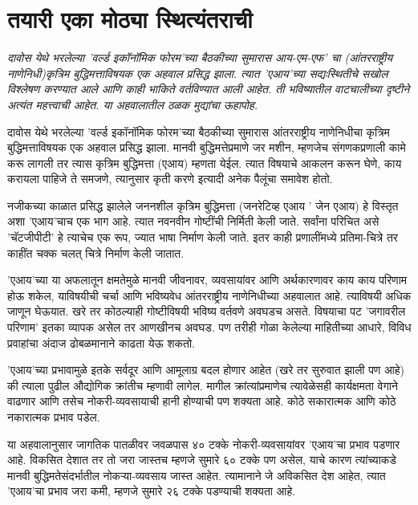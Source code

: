 \chapter{तयारी एका मोठ्या स्थित्यंतराची }

{\textit{दावोस येथे भरलेल्या 'वर्ल्ड इकॉनॉमिक फोरम'च्या बैठकीच्या सुमारास आय-एम-एफ' चा (आंतरराष्ट्रीय नाणेनिधी)कृत्रिम बुद्धिमत्ताविषयक एक अहवाल प्रसिद्ध झाला. त्यात 'एआय'च्या सद्यःस्थितीचे सखोल विश्लेषण करण्यात आले आणि काही भाकिते वर्तविण्यात आली आहेत. ती भविष्यातील वाटचालीच्या दृष्टीने अत्यंत महत्त्वाची आहेत. या अहवालातील ठळक मुद्यांचा ऊहापोह.}}

\vspace{1.5em}

दावोस येथे भरलेल्या 'वर्ल्ड इकॉनॉमिक फोरम'च्या बैठकीच्या सुमारास आंतरराष्ट्रीय नाणेनिधीचा कृत्रिम बुद्धिमत्ताविषयक एक अहवाल प्रसिद्ध झाला. मानवी बुद्धिमत्तेप्रमाणे जर मशीन, म्हणजेच संगणकप्रणाली कामे करू लागली तर त्यास कृत्रिम बुद्धिमत्ता (एआय) म्हणता येईल. त्यात विषयाचे आकलन करून घेणे, काय करायला पाहिजे ते समजणे, त्यानुसार कृती करणे इत्यादी अनेक पैलूंचा समावेश होतो.

नजीकच्या काळात प्रसिद्ध झालेले जननशील कृत्रिम बुद्धिमत्ता (जनरेटिव्ह एआय ' जेन एआय) हे विस्तृत अशा 'एआय'चाच एक भाग आहे. त्यात नवनवीन गोष्टींची निर्मिती केली जाते. सर्वांना परिचित असे 'चॅटजीपीटी' हे त्याचेच एक रूप, ज्यात भाषा निर्माण केली जाते. इतर काही प्रणालींमध्ये प्रतिमा-चित्रे तर काहींत चक्क चलत् चित्रे निर्माण केली जातात.

'एआय'च्या या अफलातून क्षमतेमुळे मानवी जीवनावर, व्यवसायांवर आणि अर्थकारणावर काय काय परिणाम होऊ शकेल, याविषयीची चर्चा आणि भविष्यवेध आंतरराष्ट्रीय नाणेनिधीच्या अहवालात आहे. त्याविषयी अधिक जाणून घेऊयात. खरे तर कोठल्याही गोष्टीविषयी भविष्य वर्तवणे अवघडच असते. विषयाचा पट 'जगावरील परिणाम' इतका व्यापक असेल तर आणखीनच अवघड. पण तरीही गोळा केलेल्या माहितीच्या आधारे, विविध प्रवाहांचा अंदाज ढोबळमानाने काढता येऊ शकतो.

'एआय'च्या प्रभावामुळे इतके सर्वदूर आणि आमूलाग्र बदल होणार आहेत (खरे तर सुरुवात झाली पण आहे) की त्याला पुढील औद्योगिक क्रांतीच म्हणावी लागेल. मागील क्रांत्यांप्रमाणेच त्यावेळेसही कार्यक्षमता वेगाने वाढणार आणि तसेच नोकरी-व्यवसायाची हानी होण्याची पण शक्यता आहे. कोठे सकारात्मक आणि कोठे नकारात्मक प्रभाव पडेल.

या अहवालानुसार जागतिक पातळीवर जवळपास ४० टक्के नोकरी-व्यवसायांवर 'एआय'चा प्रभाव पडणार आहे. विकसित देशात तर तो जरा जास्तच म्हणजे सुमारे ६० टक्के पण असेल, याचे कारण त्यांच्याकडे मानवी बुद्धिमतेसंदर्भातील नोकऱ्या-व्यवसाय जास्त आहेत. त्यामानाने जे अविकसित देश आहेत, त्यात 'एआय'चा प्रभाव जरा कमी, म्हणजे सुमारे २६ टक्के पडण्याची शक्यता आहे.

